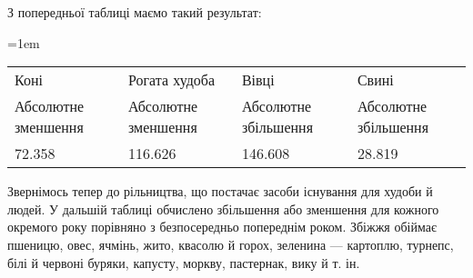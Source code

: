З попередньої таблиці маємо такий результат:
\begin{table}[h]

  \newlength{\myheight}
  \hangindent=1em
  \setlength{\myheight}{10em}
  \noindent\begin{tabularx}{\textwidth}{Y Y Y Y }
      Коні & Рогата худоба & Вівці & Свині \\
      Абсолютне зменшення & Абсолютне зменшення & Абсолютне збільшення & Абсолютне збільшення \\
      72.358 & 116.626 & 146.608 & 28.819 \footnotemark{}\\

  \end{tabularx}

\end {table}

Звернімось тепер до рільництва, що постачає засоби існування
для худоби й людей. У дальшій таблиці обчислено збільшення
або зменшення для кожного окремого року порівняно з безпосередньо
попереднім роком. Збіжжя обіймає пшеницю, овес,
ячмінь, жито, квасолю й горох, зеленина — картоплю, турнепс,
білі й червоні буряки, капусту, моркву, пастернак, вику й т. ін.


